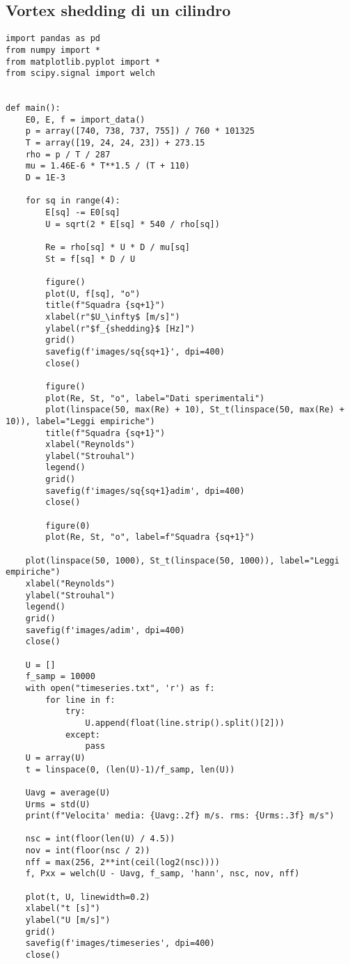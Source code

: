 \subsection{Vortex shedding di un cilindro}\label{b10}
\begin{lstlisting}
import pandas as pd
from numpy import *
from matplotlib.pyplot import *
from scipy.signal import welch


def main():
    E0, E, f = import_data()
    p = array([740, 738, 737, 755]) / 760 * 101325
    T = array([19, 24, 24, 23]) + 273.15
    rho = p / T / 287
    mu = 1.46E-6 * T**1.5 / (T + 110)
    D = 1E-3

    for sq in range(4):
        E[sq] -= E0[sq]
        U = sqrt(2 * E[sq] * 540 / rho[sq])

        Re = rho[sq] * U * D / mu[sq]
        St = f[sq] * D / U

        figure()
        plot(U, f[sq], "o")
        title(f"Squadra {sq+1}")
        xlabel(r"$U_\infty$ [m/s]")
        ylabel(r"$f_{shedding}$ [Hz]")
        grid()
        savefig(f'images/sq{sq+1}', dpi=400)
        close()

        figure()
        plot(Re, St, "o", label="Dati sperimentali")
        plot(linspace(50, max(Re) + 10), St_t(linspace(50, max(Re) + 10)), label="Leggi empiriche")
        title(f"Squadra {sq+1}")
        xlabel("Reynolds")
        ylabel("Strouhal")
        legend()
        grid()
        savefig(f'images/sq{sq+1}adim', dpi=400)
        close()

        figure(0)
        plot(Re, St, "o", label=f"Squadra {sq+1}")

    plot(linspace(50, 1000), St_t(linspace(50, 1000)), label="Leggi empiriche")
    xlabel("Reynolds")
    ylabel("Strouhal")
    legend()
    grid()
    savefig(f'images/adim', dpi=400)
    close()

    U = []
    f_samp = 10000
    with open("timeseries.txt", 'r') as f:
        for line in f:
            try:
                U.append(float(line.strip().split()[2]))
            except:
                pass
    U = array(U)
    t = linspace(0, (len(U)-1)/f_samp, len(U))

    Uavg = average(U)
    Urms = std(U)
    print(f"Velocita' media: {Uavg:.2f} m/s. rms: {Urms:.3f} m/s")

    nsc = int(floor(len(U) / 4.5))
    nov = int(floor(nsc / 2))
    nff = max(256, 2**int(ceil(log2(nsc))))
    f, Pxx = welch(U - Uavg, f_samp, 'hann', nsc, nov, nff)

    plot(t, U, linewidth=0.2)
    xlabel("t [s]")
    ylabel("U [m/s]")
    grid()
    savefig(f'images/timeseries', dpi=400)
    close()


\end{lstlisting}
